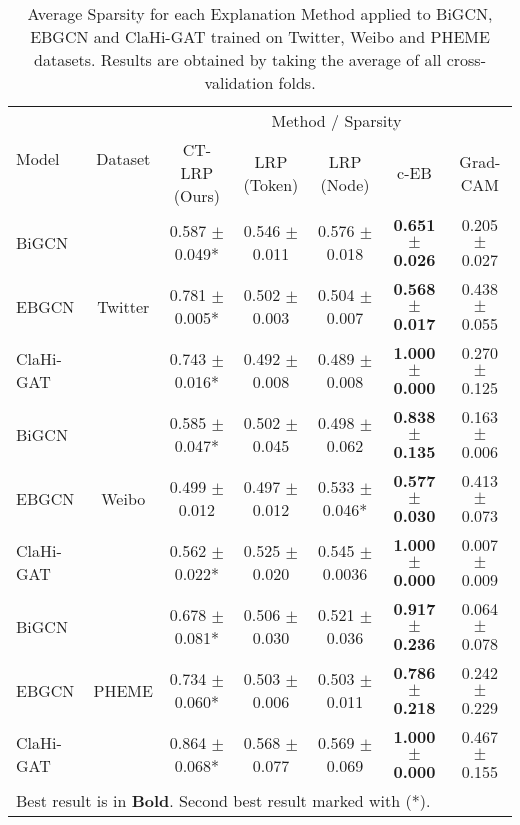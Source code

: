 \begin{table*}[hbt!]
\caption{Average Sparsity for each Explanation Method applied to BiGCN, EBGCN and ClaHi-GAT trained on Twitter, Weibo and PHEME datasets. Results are obtained by taking the average of all cross-validation folds.}
\centering
\begin{tabular}{|l|c|c|c|c|c|c|}
\hline
\multirow{2}{*}{Model} & \multirow{2}{*}{Dataset} & \multicolumn{5}{c|}{Method / Sparsity}                                                                                      \\ \cline{3-7} 
                       &                          & CT-LRP (Ours)              & LRP (Token)       & LRP (Node)              & c-EB                      & Grad-CAM         \\ \hline
BiGCN                  & \multirow{3}{*}{Twitter} & 0.587 $\pm$0.049*           & {0.546 $\pm$0.011} & 0.576 $\pm$0.018  & \textbf{0.651 $\pm$0.026} & 0.205 $\pm$0.027 \\ \cline{1-1} \cline{3-7} 
EBGCN                  &                          & {0.781 $\pm$0.005*} & 0.502 $\pm$0.003           & 0.504 $\pm$0.007  & \textbf{0.568 $\pm$0.017} & 0.438 $\pm$0.055 \\ \cline{1-1} \cline{3-7} 
ClaHi-GAT              &                          & {0.743 $\pm$0.016*} & 0.492 $\pm$0.008           & 0.489 $\pm$0.008  & \textbf{1.000 $\pm$0.000} & 0.270 $\pm$0.125 \\ \hline
BiGCN                  & \multirow{3}{*}{Weibo}   & 0.585 $\pm$0.047*           & {0.502 $\pm$0.045} & 0.498 $\pm$0.062  & \textbf{0.838 $\pm$0.135} & 0.163 $\pm$0.006 \\ \cline{1-1} \cline{3-7} 
EBGCN                  &                          & {0.499 $\pm$0.012} & 0.497 $\pm$0.012           & 0.533 $\pm$0.046*  & \textbf{0.577 $\pm$0.030} & 0.413 $\pm$0.073 \\ \cline{1-1} \cline{3-7} 
ClaHi-GAT              &                          & 0.562 $\pm$0.022*           & {0.525 $\pm$0.020} & 0.545 $\pm$0.0036 & \textbf{1.000 $\pm$0.000} & 0.007 $\pm$0.009 \\ \hline
BiGCN                  & \multirow{3}{*}{PHEME}   & 0.678 $\pm$0.081*           & {0.506 $\pm$0.030} & 0.521 $\pm$0.036  & \textbf{0.917 $\pm$0.236} & 0.064 $\pm$0.078 \\ \cline{1-1} \cline{3-7} 
EBGCN                  &                          & {0.734 $\pm$0.060*} & 0.503 $\pm$0.006           & 0.503 $\pm$0.011  & \textbf{0.786 $\pm$0.218} & 0.242 $\pm$0.229 \\ \cline{1-1} \cline{3-7} 
ClaHi-GAT              &                          & 0.864 $\pm$0.068*           & {0.568 $\pm$0.077} & 0.569 $\pm$0.069  & \textbf{1.000 $\pm$0.000} & 0.467 $\pm$0.155 \\ \hline
\multicolumn{7}{l}{\footnotesize{Best result is in \textbf{Bold}. Second best result marked with (*).}} \\
\end{tabular}

\label{tab:sparsity}
\end{table*}


